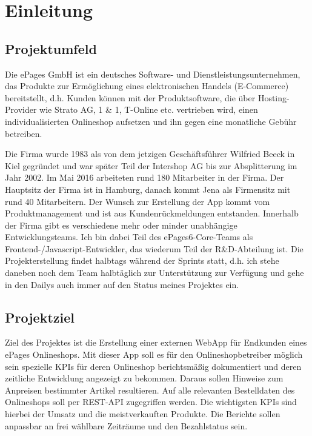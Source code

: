 \section{Einleitung}
\label{sec:Einleitung}


\subsection{Projektumfeld} 
\label{sec:Projektumfeld}
Die ePages GmbH ist ein deutsches Software- und Dienstleistungsunternehmen, das Produkte zur Ermöglichung eines elektronischen Handels (E-Commerce) bereitstellt, d.h. Kunden können mit der Produktsoftware, die über Hosting-Provider wie Strato AG, 1 \& 1, T-Online etc. vertrieben wird, einen individualisierten Onlineshop aufsetzen und ihn gegen eine monatliche Gebühr betreiben.

Die Firma wurde 1983 als  von dem jetzigen Geschäftsführer Wilfried Beeck in Kiel gegründet und war später Teil der Intershop AG bis zur Absplitterung im Jahr 2002. Im Mai 2016 arbeiteten rund 180 Mitarbeiter in der Firma. Der Hauptsitz der Firma ist in Hamburg, danach kommt Jena als Firmensitz mit rund 40 Mitarbeitern. Der Wunsch zur Erstellung der \acs{App} kommt vom Produktmanagement und ist aus Kundenrückmeldungen entstanden. Innerhalb der Firma gibt es verschiedene mehr oder minder unabhängige Entwicklungsteams. Ich bin dabei Teil des ePages6-Core-Teams als Frontend-/Javascript-Entwickler, das wiederum Teil der R\&D-Abteilung ist. Die Projekterstellung findet halbtags während der Sprints statt, d.h. ich stehe daneben noch dem Team halbtäglich zur Unterstützung zur Verfügung und gehe in den Dailys auch immer auf den Status meines Projektes ein. 

\subsection{Projektziel} 
\label{sec:Projektziel}

Ziel des Projektes ist die Erstellung einer externen WebApp für Endkunden eines ePages Onlineshops. Mit dieser App soll es für den Onlineshopbetreiber möglich sein spezielle \acs{KPI}s für deren Onlineshop berichtsmäßig dokumentiert und deren zeitliche Entwicklung angezeigt zu bekommen. Daraus sollen Hinweise zum Anpreisen bestimmter Artikel resultieren. Auf alle relevanten Bestelldaten des Onlineshops soll per REST-API zugegriffen werden. Die wichtigsten \acs{KPI}s sind hierbei der Umsatz und die meistverkauften Produkte. Die Berichte sollen anpassbar an frei wählbare Zeiträume und den Bezahlstatus sein.



